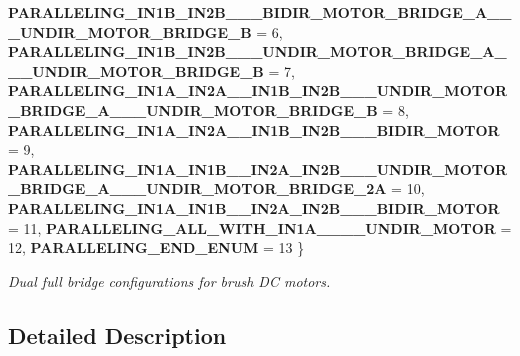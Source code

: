 \begin{DoxyCompactItemize}
{\bfseries P\+A\+R\+A\+L\+L\+E\+L\+I\+N\+G\+\_\+\+I\+N1\+B\+\_\+\+I\+N2\+B\+\_\+\+\_\+\_\+\+B\+I\+D\+I\+R\+\_\+\+M\+O\+T\+O\+R\+\_\+\+B\+R\+I\+D\+G\+E\+\_\+\+A\+\_\+\+\_\+\_\+\+U\+N\+D\+I\+R\+\_\+\+M\+O\+T\+O\+R\+\_\+\+B\+R\+I\+D\+G\+E\+\_\+B} = 6, 
{\bfseries P\+A\+R\+A\+L\+L\+E\+L\+I\+N\+G\+\_\+\+I\+N1\+B\+\_\+\+I\+N2\+B\+\_\+\+\_\+\_\+\+U\+N\+D\+I\+R\+\_\+\+M\+O\+T\+O\+R\+\_\+\+B\+R\+I\+D\+G\+E\+\_\+\+A\+\_\+\+\_\+\_\+\+U\+N\+D\+I\+R\+\_\+\+M\+O\+T\+O\+R\+\_\+\+B\+R\+I\+D\+G\+E\+\_\+B} = 7, 
\newline
{\bfseries P\+A\+R\+A\+L\+L\+E\+L\+I\+N\+G\+\_\+\+I\+N1\+A\+\_\+\+I\+N2\+A\+\_\+\+\_\+\+I\+N1\+B\+\_\+\+I\+N2\+B\+\_\+\+\_\+\_\+\+U\+N\+D\+I\+R\+\_\+\+M\+O\+T\+O\+R\+\_\+\+B\+R\+I\+D\+G\+E\+\_\+\+A\+\_\+\+\_\+\_\+\+U\+N\+D\+I\+R\+\_\+\+M\+O\+T\+O\+R\+\_\+\+B\+R\+I\+D\+G\+E\+\_\+B} = 8, 
{\bfseries P\+A\+R\+A\+L\+L\+E\+L\+I\+N\+G\+\_\+\+I\+N1\+A\+\_\+\+I\+N2\+A\+\_\+\+\_\+\+I\+N1\+B\+\_\+\+I\+N2\+B\+\_\+\+\_\+\_\+\+B\+I\+D\+I\+R\+\_\+\+M\+O\+T\+OR} = 9, 
{\bfseries P\+A\+R\+A\+L\+L\+E\+L\+I\+N\+G\+\_\+\+I\+N1\+A\+\_\+\+I\+N1\+B\+\_\+\+\_\+\+I\+N2\+A\+\_\+\+I\+N2\+B\+\_\+\+\_\+\_\+\+U\+N\+D\+I\+R\+\_\+\+M\+O\+T\+O\+R\+\_\+\+B\+R\+I\+D\+G\+E\+\_\+A\+\_\+\+\_\+\_\+\+U\+N\+D\+I\+R\+\_\+\+M\+O\+T\+O\+R\+\_\+\+B\+R\+I\+D\+G\+E\+\_\+2A} = 10, 
{\bfseries P\+A\+R\+A\+L\+L\+E\+L\+I\+N\+G\+\_\+\+I\+N1\+A\+\_\+\+I\+N1\+B\+\_\+\+\_\+\+I\+N2\+A\+\_\+\+I\+N2\+B\+\_\+\+\_\+\_\+\+B\+I\+D\+I\+R\+\_\+\+M\+O\+T\+OR} = 11, 
\newline
{\bfseries P\+A\+R\+A\+L\+L\+E\+L\+I\+N\+G\+\_\+\+A\+L\+L\+\_\+\+W\+I\+T\+H\+\_\+\+I\+N1\+A\+\_\+\+\_\+\+\_\+\_\+\+U\+N\+D\+I\+R\+\_\+\+M\+O\+T\+OR} = 12, 
{\bfseries P\+A\+R\+A\+L\+L\+E\+L\+I\+N\+G\+\_\+\+E\+N\+D\+\_\+\+E\+N\+UM} = 13
 \}
\begin{DoxyCompactList}\small\item\em Dual full bridge configurations for brush DC motors. \end{DoxyCompactList}\end{DoxyCompactItemize}


\subsection{Detailed Description}
